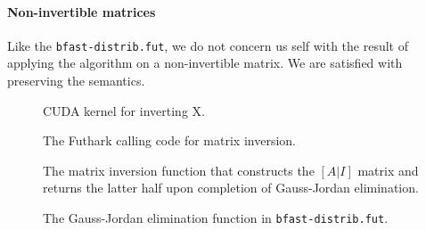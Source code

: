 \paragraph{Non-invertible matrices}
Like the \texttt{bfast-distrib.fut}, we do not concern us self with the result
of applying the algorithm on a non-invertible matrix. We are satisfied with
preserving the semantics.


\begin{figure}[H]
    \centering
    \caption{CUDA kernel for inverting X.}
    \label{cuda:kernel3}
\end{figure}


\begin{figure}[H]
    \centering
    \caption{The Futhark calling code for matrix inversion.}
    \label{fut:kernel3}
\end{figure}


\begin{figure}[H]
    \centering
    \caption{The matrix inversion function that constructs the \([A|I]\) matrix
    and returns the latter half upon completion of Gauss-Jordan elimination.}
    \label{fut:matinv}
\end{figure}

\begin{figure}[H]
    \centering
    \caption{The Gauss-Jordan elimination function in \texttt{bfast-distrib.fut}.}
    \label{fut:gaussjordan}
\end{figure}





